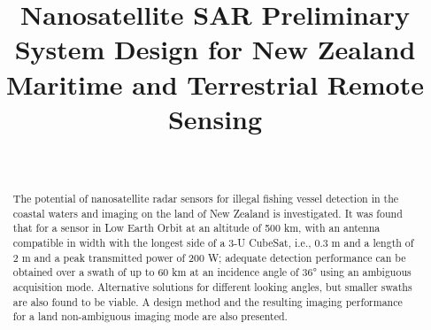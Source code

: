 \documentclass[conference,a4paper]{IEEEtran}
\begin{document}
%
    \title{Nanosatellite SAR Preliminary System Design for New Zealand Maritime and Terrestrial Remote Sensing}

    \author{                                     %
    \\
    }





    \maketitle

    \begin{abstract}
        The potential of nanosatellite radar sensors for illegal fishing vessel detection in the coastal waters and imaging on the land of New Zealand is investigated.
        It was found that for a sensor in Low Earth Orbit at an altitude of 500 km, with an antenna compatible in width with the longest side of a 3-U CubeSat, i.e., 0.3 m and a length of 2 m and a peak transmitted power of 200 W; adequate detection performance can be obtained over a swath of up to 60 km at an incidence angle of 36° using an ambiguous acquisition mode.
        Alternative solutions for different looking angles, but smaller swaths are also found to be viable.
        A design method and the resulting imaging performance for a land non-ambiguous imaging mode are also presented.
    \end{abstract}
\end{document}
